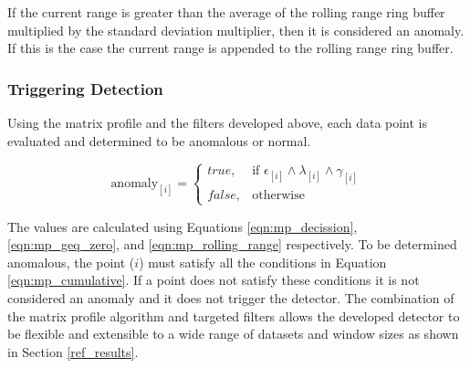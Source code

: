 If the current range is greater than the average of the rolling range ring buffer multiplied by the standard deviation multiplier, then it is considered an anomaly. If this is the case the current range is appended to the rolling range ring buffer.

\subsubsection{Triggering Detection}

Using the matrix profile and the filters developed above, each data point is evaluated and determined to be anomalous or normal.

\begin{equation}
    \label{eqn:mp_cumulative}
    \text{anomaly}_{[i]}=
    \begin{cases}
        true,& \text{if } \epsilon_{[i]} \land \lambda_{[i]} \land \gamma_{[i]}\\
        false,              & \text{otherwise}
    \end{cases}
\end{equation}

The values are calculated using Equations \eqref{eqn:mp_decission}, \eqref{eqn:mp_geq_zero}, and \eqref{eqn:mp_rolling_range} respectively.
To be determined anomalous, the point ($i$) must satisfy all the conditions in Equation \eqref{eqn:mp_cumulative}.
If a point does not satisfy these conditions it is not considered an anomaly and it does not trigger the detector.
The combination of the matrix profile algorithm and targeted filters allows the developed detector to be flexible and extensible to a wide range of datasets and window sizes as shown in Section \ref{ref_results}.
